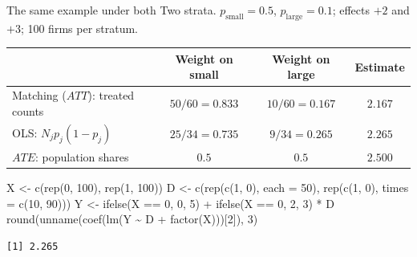 \documentclass[
  11pt,
  ignorenonframetext,
  aspectratio=169,
]{beamer}
\newenvironment{Shaded}{\begin{snugshade}}{\end{snugshade}}
\newcommand{\AttributeTok}[1]{\textcolor[rgb]{0.40,0.45,0.13}{#1}}
\newcommand{\DecValTok}[1]{\textcolor[rgb]{0.68,0.00,0.00}{#1}}
\newcommand{\FunctionTok}[1]{\textcolor[rgb]{0.28,0.35,0.67}{#1}}
\newcommand{\NormalTok}[1]{\textcolor[rgb]{0.00,0.23,0.31}{#1}}
\newcommand{\OtherTok}[1]{\textcolor[rgb]{0.00,0.23,0.31}{#1}}
\newcommand{\SpecialCharTok}[1]{\textcolor[rgb]{0.37,0.37,0.37}{#1}}
\begin{document}
\begin{frame}[fragile]{The same example under both}
\protect{}\label{the-same-example-under-both}
Two strata. \(p_{\text{small}} = 0.5\), \(p_{\text{large}} = 0.1\);
effects \(+2\) and \(+3\); 100 firms per stratum.

\begin{center}
\begin{tabular}{lccc}
\toprule
& Weight on small & Weight on large & Estimate \\
\midrule
Matching ($ATT$): treated counts & $50/60 = 0.833$ & $10/60 = 0.167$ & $\mathbf{2.167}$ \\
OLS: $N_j p_j(1-p_j)$            & $25/34 = 0.735$ & $9/34 = 0.265$  & $\mathbf{2.265}$ \\
$ATE$: population shares         & $0.5$           & $0.5$           & $\mathbf{2.500}$ \\
\bottomrule
\end{tabular}
\end{center}

\begin{Shaded}
\begin{Highlighting}[]
\NormalTok{X }\OtherTok{\textless{}{-}} \FunctionTok{c}\NormalTok{(}\FunctionTok{rep}\NormalTok{(}\DecValTok{0}\NormalTok{, }\DecValTok{100}\NormalTok{), }\FunctionTok{rep}\NormalTok{(}\DecValTok{1}\NormalTok{, }\DecValTok{100}\NormalTok{))}
\NormalTok{D }\OtherTok{\textless{}{-}} \FunctionTok{c}\NormalTok{(}\FunctionTok{rep}\NormalTok{(}\FunctionTok{c}\NormalTok{(}\DecValTok{1}\NormalTok{, }\DecValTok{0}\NormalTok{), }\AttributeTok{each =} \DecValTok{50}\NormalTok{), }\FunctionTok{rep}\NormalTok{(}\FunctionTok{c}\NormalTok{(}\DecValTok{1}\NormalTok{, }\DecValTok{0}\NormalTok{), }\AttributeTok{times =} \FunctionTok{c}\NormalTok{(}\DecValTok{10}\NormalTok{, }\DecValTok{90}\NormalTok{)))}
\NormalTok{Y }\OtherTok{\textless{}{-}} \FunctionTok{ifelse}\NormalTok{(X }\SpecialCharTok{==} \DecValTok{0}\NormalTok{, }\DecValTok{0}\NormalTok{, }\DecValTok{5}\NormalTok{) }\SpecialCharTok{+} \FunctionTok{ifelse}\NormalTok{(X }\SpecialCharTok{==} \DecValTok{0}\NormalTok{, }\DecValTok{2}\NormalTok{, }\DecValTok{3}\NormalTok{) }\SpecialCharTok{*}\NormalTok{ D}
\FunctionTok{round}\NormalTok{(}\FunctionTok{unname}\NormalTok{(}\FunctionTok{coef}\NormalTok{(}\FunctionTok{lm}\NormalTok{(Y }\SpecialCharTok{\textasciitilde{}}\NormalTok{ D }\SpecialCharTok{+} \FunctionTok{factor}\NormalTok{(X)))[}\DecValTok{2}\NormalTok{]), }\DecValTok{3}\NormalTok{)}
\end{Highlighting}
\end{Shaded}

\begin{verbatim}
[1] 2.265
\end{verbatim}
\end{frame}
\end{document}

